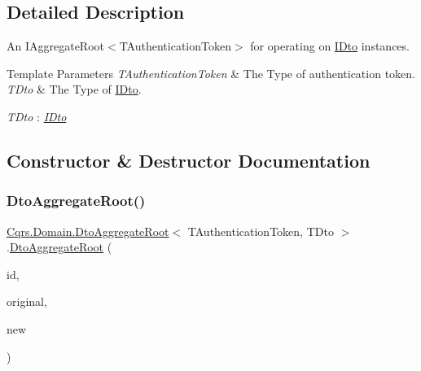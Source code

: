 \subsection{Detailed Description}
An I\+Aggregate\+Root$<$\+T\+Authentication\+Token$>$ for operating on \hyperlink{interfaceCqrs_1_1Domain_1_1IDto}{I\+Dto} instances. 


\begin{DoxyTemplParams}{Template Parameters}
{\em T\+Authentication\+Token} & The Type of authentication token.\\
\hline
{\em T\+Dto} & The Type of \hyperlink{interfaceCqrs_1_1Domain_1_1IDto}{I\+Dto}.\\
\hline
\end{DoxyTemplParams}
\begin{Desc}
\item[Type Constraints]\begin{description}
\item[{\em T\+Dto} : {\em \hyperlink{interfaceCqrs_1_1Domain_1_1IDto}{I\+Dto}}]\end{description}
\end{Desc}


\subsection{Constructor \& Destructor Documentation}
\mbox{\label{classCqrs_1_1Domain_1_1DtoAggregateRoot_aa99d95d5b4b1fb8a59beda77f7e12c20_aa99d95d5b4b1fb8a59beda77f7e12c20}} 
\subsubsection{\texorpdfstring{Dto\+Aggregate\+Root()}{DtoAggregateRoot()}}
{\footnotesize\ttfamily \hyperlink{classCqrs_1_1Domain_1_1DtoAggregateRoot}{Cqrs.\+Domain.\+Dto\+Aggregate\+Root}$<$ T\+Authentication\+Token, T\+Dto $>$.\hyperlink{classCqrs_1_1Domain_1_1DtoAggregateRoot}{Dto\+Aggregate\+Root} (\begin{DoxyParamCaption}\item[{Guid}]{id,  }\item[{T\+Dto}]{original,  }\item[{T\+Dto @}]{new }\end{DoxyParamCaption})}



